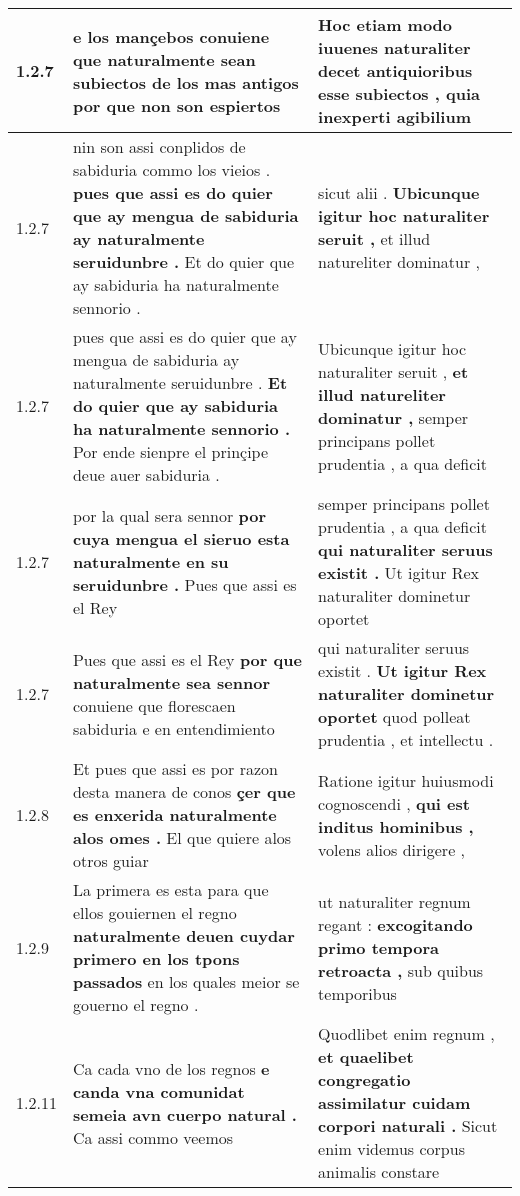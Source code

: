 \begin{tabular}{|p{1cm}|p{6.5cm}|p{6.5cm}|}
1.2.7 & e los mançebos \textbf{ conuiene que naturalmente sean subiectos de los mas antigos } por que non son espiertos & Hoc etiam modo iuuenes naturaliter decet \textbf{ antiquioribus esse subiectos , } quia inexperti agibilium \\\hline
1.2.7 & nin son assi conplidos de sabiduria commo los vieios . \textbf{ pues que assi es do quier que ay mengua de sabiduria ay naturalmente seruidunbre . } Et do quier que ay sabiduria ha naturalmente sennorio . & sicut alii . \textbf{ Ubicunque igitur hoc naturaliter seruit , } et illud natureliter dominatur , \\\hline
1.2.7 & pues que assi es do quier que ay mengua de sabiduria ay naturalmente seruidunbre . \textbf{ Et do quier que ay sabiduria ha naturalmente sennorio . } Por ende sienpre el prinçipe deue auer sabiduria . & Ubicunque igitur hoc naturaliter seruit , \textbf{ et illud natureliter dominatur , } semper principans pollet prudentia , a qua deficit \\\hline
1.2.7 & por la qual sera sennor \textbf{ por cuya mengua el sieruo esta naturalmente en su seruidunbre . } Pues que assi es el Rey & semper principans pollet prudentia , a qua deficit \textbf{ qui naturaliter seruus existit . } Ut igitur Rex naturaliter dominetur oportet \\\hline
1.2.7 & Pues que assi es el Rey \textbf{ por que naturalmente sea sennor } conuiene que florescaen sabiduria e en entendimiento & qui naturaliter seruus existit . \textbf{ Ut igitur Rex naturaliter dominetur oportet } quod polleat prudentia , et intellectu . \\\hline
1.2.8 & Et pues que assi es por razon desta manera de conos \textbf{ çer que es enxerida naturalmente alos omes . } El que quiere alos otros guiar & Ratione igitur huiusmodi cognoscendi , \textbf{ qui est inditus hominibus , } volens alios dirigere , \\\hline
1.2.9 & La primera es esta para que ellos gouiernen el regno \textbf{ naturalmente deuen cuydar primero en los tpons passados } en los quales meior se gouerno el regno . & ut naturaliter regnum regant : \textbf{ excogitando primo tempora retroacta , } sub quibus temporibus \\\hline
1.2.11 & Ca cada vno de los regnos \textbf{ e canda vna comunidat semeia avn cuerpo natural . } Ca assi commo veemos & Quodlibet enim regnum , \textbf{ et quaelibet congregatio assimilatur cuidam corpori naturali . } Sicut enim videmus corpus animalis constare \\\hline

\end{tabular}
